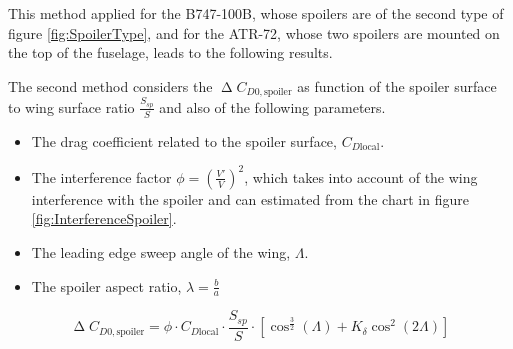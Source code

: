 \bigskip
\noindent
This method applied for the B747-100B, whose spoilers are of the second type of figure \ref{fig:SpoilerType}, and for the ATR-72, whose two spoilers are mounted on the top of the fuselage, leads to the following results. 
%
\clearpage
%
\begin{table}[!t]
  \centering
    \caption{$\upDelta C_{D0,\text{spoiler}}$ of B747-100B and ATR-72 using equation \ref{eqn:RoskamSpoiler}}
\end{table}
%
\noindent
The second method considers the $\upDelta C_{D0,\text{spoiler}}$ as function of the spoiler surface to wing surface ratio $\frac{S_{sp}}{S}$ and also of the following parameters.
%
\begin{itemize}
\item The drag coefficient related to the spoiler surface, $C_{D\text{local}}$.
\item The interference factor $\phi=\left(\frac{V'}{V}\right)^2$, which takes into account of the wing interference with the spoiler and can estimated from the chart in figure \ref{fig:InterferenceSpoiler}.
\item The leading edge sweep angle of the wing, $\Lambda$.
\item The spoiler aspect ratio, $\lambda=\frac{b}{a}$
\end{itemize}
%
\begin{equation}
\upDelta C_{D0,\text{spoiler}}=\phi\cdot C_{D\text{local}}\cdot \dfrac{S_{sp}}{S}\cdot \left[\cos^{\frac{3}{2}}\left(\Lambda\right)+K_\delta\cos^2 \left(2\Lambda\right)\right]
\label{eqn:LausettiSpoiler}
\end{equation}
